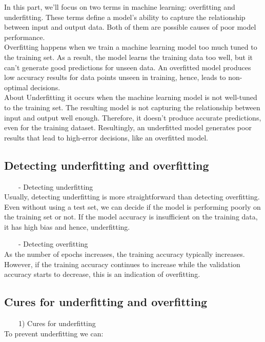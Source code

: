 \documentclass[
]{book}
\begin{document}
In this part, we'll focus on two terms in machine learning: overfitting and underfitting. These terms define a model's ability to capture the relationship between input and output data. Both of them are possible causes of poor model performance.\\
Overfitting happens when we train a machine learning model too much tuned to the training set. As a result, the model learns the training data too well, but it can't generate good predictions for unseen data. An overfitted model produces low accuracy results for data points unseen in training, hence, leads to non-optimal decisions.\\
About Underfitting it occurs when the machine learning model is not well-tuned to the training set. The resulting model is not capturing the relationship between input and output well enough. Therefore, it doesn't produce accurate predictions, even for the training dataset. Resultingly, an underfitted model generates poor results that lead to high-error decisions, like an overfitted model.

\hypertarget{detecting-underfitting-and-overfitting}{%
\subsection{Detecting underfitting and overfitting}\label{detecting-underfitting-and-overfitting}}

~~~~- Detecting underfitting\\
Usually, detecting underfitting is more straightforward than detecting overfitting. Even without using a test set, we can decide if the model is performing poorly on the training set or not. If the model accuracy is insufficient on the training data, it has high bias and hence, underfitting.

~~~~- Detecting overfitting\\
As the number of epochs increases, the training accuracy typically increases. However, if the training accuracy continues to increase while the validation accuracy starts to decrease, this is an indication of overfitting.

\hypertarget{cures-for-underfitting-and-overfitting}{%
\subsection{Cures for underfitting and overfitting}\label{cures-for-underfitting-and-overfitting}}

~~~~1) Cures for underfitting\\
To prevent underfitting we can:
\end{document}
